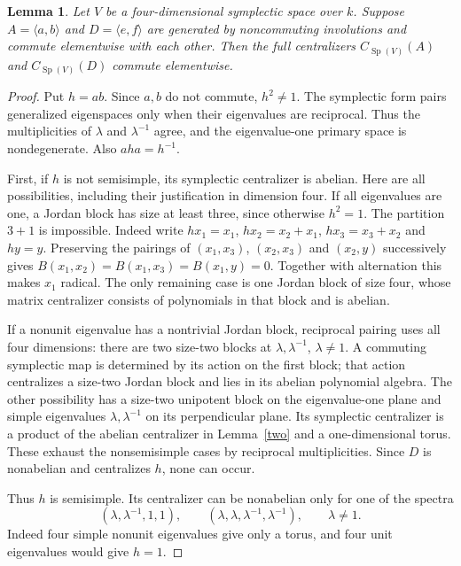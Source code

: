 \documentclass[11pt,a4paper]{article}
\newtheorem{lemma}{Lemma}
\newcommand{\Sp}{\operatorname{Sp}}
\newcommand{\gen}[1]{\langle#1\rangle}
\begin{document}
\begin{lemma}\label{centralizers}
Let $V$ be a four-dimensional symplectic space over $k$.
Suppose $A=\gen{a,b}$ and $D=\gen{e,f}$ are generated by
noncommuting involutions and commute elementwise with each other.
Then the full centralizers $C_{\Sp(V)}(A)$ and
$C_{\Sp(V)}(D)$ commute elementwise.
\end{lemma}
\begin{proof}
Put $h=ab$. Since $a,b$ do not commute, $h^2\ne1$.
The symplectic form pairs generalized eigenspaces only when their
eigenvalues are reciprocal. Thus the multiplicities of $\lambda$ and
$\lambda^{-1}$ agree, and the eigenvalue-one primary space is
nondegenerate. Also $aha=h^{-1}$.

First, if $h$ is not semisimple, its symplectic centralizer is abelian.
Here are all possibilities, including their justification in dimension four.
If all eigenvalues are one, a Jordan block has size at least three,
since otherwise $h^2=1$. The partition $3+1$ is impossible.
Indeed write $h x_1=x_1$, $h x_2=x_2+x_1$,
$h x_3=x_3+x_2$ and $h y=y$.
Preserving the pairings of $(x_1,x_3)$, $(x_2,x_3)$ and $(x_2,y)$
successively gives
$B(x_1,x_2)=B(x_1,x_3)=B(x_1,y)=0$.
Together with alternation this makes $x_1$ radical.
The only remaining case is one Jordan block of size four, whose
matrix centralizer consists of polynomials in that block and is abelian.

If a nonunit eigenvalue has a nontrivial Jordan block, reciprocal pairing
uses all four dimensions: there are two size-two blocks at
$\lambda,\lambda^{-1}$, $\lambda\ne1$.
A commuting symplectic map is determined by its action on the first
block; that action centralizes a size-two Jordan block and lies in
its abelian polynomial algebra. The other possibility has a size-two
unipotent block on the eigenvalue-one plane and simple eigenvalues
$\lambda,\lambda^{-1}$ on its perpendicular plane.
Its symplectic centralizer is a product of the abelian centralizer in
Lemma~\ref{two} and a one-dimensional torus. These exhaust the
nonsemisimple cases by reciprocal multiplicities.
Since $D$ is nonabelian and centralizes $h$, none can occur.

Thus $h$ is semisimple. Its centralizer can be nonabelian only for
one of the spectra
\[
 (\lambda,\lambda^{-1},1,1),\qquad
 (\lambda,\lambda,\lambda^{-1},\lambda^{-1}),
 \qquad \lambda\ne1.                                  \tag{1}
\]
Indeed four simple nonunit eigenvalues give only a torus, and four
unit eigenvalues would give $h=1$.


\end{proof}
\end{document}
